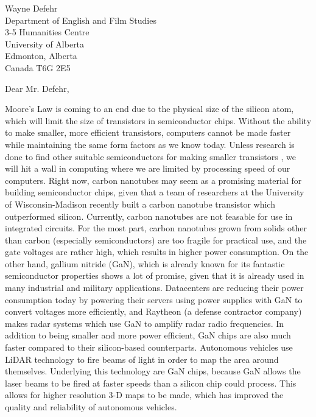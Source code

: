 \documentclass[letterpaper]{letter}
\begin{document}
\begin{letter}
{
Wayne Defehr\\
Department of English and Film Studies\\
3-5 Humanities Centre\\
University of Alberta\\
Edmonton, Alberta\\
Canada T6G 2E5\\
}

\opening{Dear Mr. Defehr,}
\doublespacing

Moore's Law is coming to an end due to the physical size of the silicon atom,
which will limit the size of transistors in semiconductor chips. Without the
ability to make smaller, more efficient transistors, computers cannot be made
faster while maintaining the same form factors as we know today. Unless research
is done to find other suitable semiconductors for making smaller transistors ,
we will hit a wall in computing where we are limited by processing speed of our
computers. Right now, carbon nanotubes may seem as a promising material for
building semiconductor chips, given that a team of researchers at the University
of Wisconsin-Madison recently built a carbon nanotube transistor which
outperformed silicon. Currently, carbon nanotubes are not feasable for
use in integrated circuits. For the most part, carbon nanotubes grown from
solids other than carbon (especially semiconductors) are too fragile for
practical use, and the gate voltages are rather high, which results in higher
power consumption. On the other hand, gallium nitride (GaN), which is already
known for its fantastic semiconductor properties shows a lot of promise, given
that it is already used in many industrial and military applications.
Datacenters are reducing their power consumption today by powering their
servers using power supplies with GaN to convert voltages more efficiently,
and Raytheon (a defense contractor company) makes radar systems which use GaN to
amplify radar radio frequencies. In addition to being smaller and more power
efficient, GaN chips are also much faster compared to their silicon-based
counterparts. Autonomous vehicles use LiDAR technology to fire beams of light in
order to map the area around themselves. Underlying this technology are GaN
chips, because GaN allows the laser beams to be fired at faster speeds than a
silicon chip could process. This allows for higher resolution 3-D maps to be
made, which has improved the quality and reliability of autonomous vehicles.

\end{letter}
\end{document}

